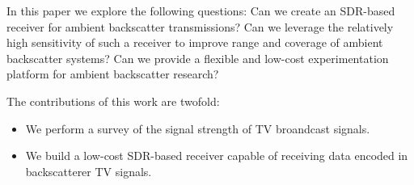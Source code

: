 In this paper we explore the following questions: Can we create an
SDR-based receiver for ambient backscatter transmissions? Can we
leverage the relatively high sensitivity of such a receiver to improve
range and coverage of ambient backscatter systems? Can we provide a
flexible and low-cost experimentation platform for ambient backscatter
research?

 The contributions of this work are twofold:
\begin{itemize}
				\item We perform a survey of the signal strength of TV
								broandcast signals.

				\item We build a low-cost SDR-based receiver capable of
								receiving data encoded in backscatterer TV signals.
\end{itemize}

